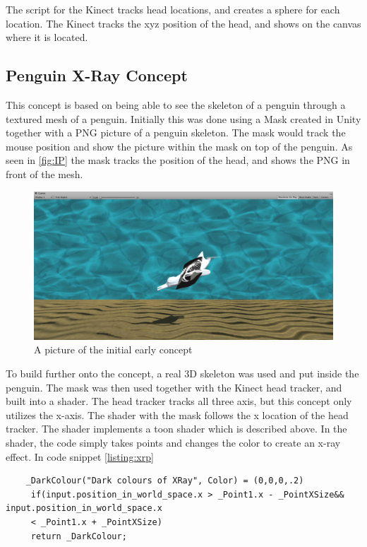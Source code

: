 The script for the Kinect tracks head locations, and creates a sphere for each location. The Kinect tracks the xyz position of the head, and shows on the canvas where it is located.

\subsection{Penguin X-Ray Concept}
This concept is based on being able to see the skeleton of a penguin through a textured mesh of a penguin. Initially this was done using a Mask created in Unity together with a PNG picture of a penguin skeleton. The mask would track the mouse position and show the picture within the mask on top of the penguin. As seen in \autoref{fig:IP} the mask tracks the position of the head, and shows the PNG in front of the mesh.

\begin{figure}[H]
	\centering
	\includegraphics[width=0.9\linewidth]{figure/Implementation/InitialPenguin.png}
	\caption{A picture of the initial early concept}
	\label{fig:IP}
\end{figure}

To build further onto the concept, a real 3D skeleton was used and put inside the penguin. The mask was then used together with the Kinect head tracker, and built into a shader. The head tracker tracks all three axis, but this concept only utilizes the x-axis. The shader with the mask follows the x location of the head tracker. The shader implements a toon shader which is described above. In the shader, the code simply takes points and changes the color to create an x-ray effect. In code snippet \autoref{listing:xrp} 

\begin{listing}[H]
	\caption{}
	\label{listing:xrp}
	\begin{verbatim}
    _DarkColour("Dark colours of XRay", Color) = (0,0,0,.2)
     if(input.position_in_world_space.x > _Point1.x - _PointXSize&& input.position_in_world_space.x 
     < _Point1.x + _PointXSize)
     return _DarkColour;

	\end{verbatim}
\end{listing}

